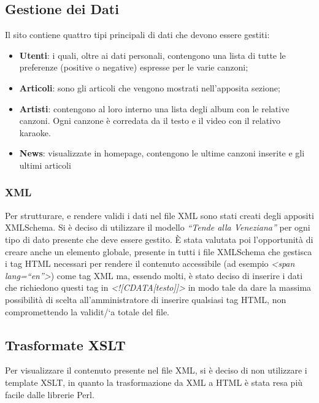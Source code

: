 \subsection{Gestione dei Dati}
Il sito contiene quattro tipi principali di dati che devono essere gestiti:
\begin{itemize}
    \item \textbf{Utenti}: i quali, oltre ai dati personali, contengono una lista di tutte le preferenze (positive o negative) espresse per le varie canzoni;
    \item \textbf{Articoli}: sono gli articoli che vengono mostrati nell'apposita sezione;
    \item \textbf{Artisti}: contengono al loro interno una lista degli album con le relative canzoni. Ogni canzone \`e corredata da il testo e il video con il relativo karaoke.
    \item \textbf{News}: visualizzate in homepage, contengono le ultime canzoni inserite e gli ultimi articoli
\end{itemize}

\subsubsection{XML}

Per strutturare, e rendere validi i dati nel file XML sono stati creati degli appositi XMLSchema.
Si \`e deciso di utilizzare il modello \textit{``Tende alla Veneziana''} per ogni tipo di dato presente che deve essere gestito.
\`E stata valutata poi l'opportunit\`a di creare anche un elemento globale, presente in tutti i file XMLSchema che gestisca i tag HTML necessari per rendere il contenuto accessibile (ad esempio \textit{\textless span lang=``en''\textgreater}) come tag XML ma, essendo molti, \`e stato deciso di inserire i dati che richiedono questi tag in \textit{\textless![CDATA[testo]]\textgreater} in modo tale da dare la massima possibilit\`a di scelta all'amministratore di inserire qualsiasi tag HTML, non compromettendo la validit/`a totale del file.

\subsection{Trasformate XSLT}

Per visualizzare il contenuto presente nel file XML, si \`e deciso di non utilizzare i template XSLT, in quanto la trasformazione da XML a HTML \`e stata resa pi\`u facile dalle librerie Perl.
